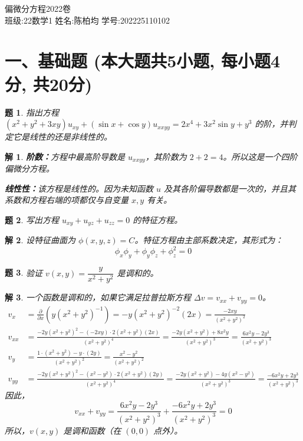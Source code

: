 \documentclass[12pt,a4paper]{article}
\newtheorem{problem}{题}
\newtheorem*{solution}{解}
\begin{document}
	
	\begin{center}
				\LARGE 偏微分方程2022卷 \\
	\vspace{0.5cm}
	\large 班级:22数学1 \quad 姓名:陈柏均 \quad 学号:202225110102
	\end{center}

	
	\section*{一、基础题 (本大题共5小题, 每小题4分, 共20分)}
	
	\begin{problem}
		指出方程 $(x^2 + y^2 + 3xy) u_{xy} + (\sin x + \cos y) u_{xxyy} = 2x^4 + 3x^2 \sin y + y^3$ 的阶，并判定它是线性的还是非线性的。
	\end{problem}
	\hrulefill
	\begin{solution}
		\textbf{阶数：}方程中最高阶导数是 $u_{xxyy}$，其阶数为 $2+2=4$。所以这是一个四阶偏微分方程。
		
		\noindent
		\textbf{线性性：}该方程是线性的。因为未知函数 $u$ 及其各阶偏导数都是一次的，并且其系数和方程右端的项都仅与自变量 $x, y$ 有关。
	\end{solution}
	\hrulefill
	
	\begin{problem}
		写出方程 $u_{xy} + u_{yz} + u_{zz} = 0$ 的特征方程。
	\end{problem}
	\hrulefill
	\begin{solution}
		设特征曲面为 $\phi(x, y, z) = C$。特征方程由主部系数决定，其形式为：
		\[
		\phi_x \phi_y + \phi_y \phi_z + \phi_z^2 = 0
		\]
	\end{solution}
	\hrulefill
	
	\begin{problem}
		验证 $v(x, y) = \dfrac{y}{x^2 + y^2}$ 是调和的。
	\end{problem}
	\hrulefill
	\begin{solution}
		一个函数是调和的，如果它满足拉普拉斯方程 $\Delta v = v_{xx} + v_{yy} = 0$。
		\begin{align*}
			v_x &= \frac{\partial}{\partial x} \left( y(x^2+y^2)^{-1} \right) = -y(x^2+y^2)^{-2}(2x) = \frac{-2xy}{(x^2+y^2)^2} \\
			v_{xx} &= \frac{-2y(x^2+y^2)^2 - (-2xy) \cdot 2(x^2+y^2)(2x)}{(x^2+y^2)^4} = \frac{-2y(x^2+y^2) + 8x^2y}{(x^2+y^2)^3} = \frac{6x^2y-2y^3}{(x^2+y^2)^3} \\
			v_y &= \frac{1 \cdot (x^2+y^2) - y \cdot (2y)}{(x^2+y^2)^2} = \frac{x^2-y^2}{(x^2+y^2)^2} \\
			v_{yy} &= \frac{-2y(x^2+y^2)^2 - (x^2-y^2) \cdot 2(x^2+y^2)(2y)}{(x^2+y^2)^4} = \frac{-2y(x^2+y^2) - 4y(x^2-y^2)}{(x^2+y^2)^3} = \frac{-6x^2y+2y^3}{(x^2+y^2)^3}
		\end{align*}
		因此，
		\[
		v_{xx} + v_{yy} = \frac{6x^2y-2y^3}{(x^2+y^2)^3} + \frac{-6x^2y+2y^3}{(x^2+y^2)^3} = 0
		\]
		所以，$v(x,y)$ 是调和函数（在 $(0,0)$ 点外）。
	\end{solution}
	\hrulefill
	
\end{document}
